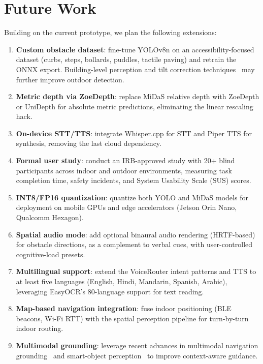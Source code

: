\section{Future Work}
\label{sec:future}

Building on the current prototype, we plan the following extensions:

\begin{enumerate}
    \item \textbf{Custom obstacle dataset}: fine-tune YOLOv8n on an accessibility-focused dataset (curbs, steps, bollards, puddles, tactile paving) and retrain the ONNX export. Building-level perception and tilt correction techniques~\cite{tilt_correction_building_detection2023} may further improve outdoor detection.
    \item \textbf{Metric depth via ZoeDepth}: replace MiDaS relative depth with ZoeDepth or UniDepth for absolute metric predictions, eliminating the linear rescaling hack.
    \item \textbf{On-device STT/TTS}: integrate Whisper.cpp for STT and Piper TTS for synthesis, removing the last cloud dependency.
    \item \textbf{Formal user study}: conduct an IRB-approved study with 20+ blind participants across indoor and outdoor environments, measuring task completion time, safety incidents, and System Usability Scale (SUS) scores.
    \item \textbf{INT8/FP16 quantization}: quantize both YOLO and MiDaS models for deployment on mobile GPUs and edge accelerators (Jetson Orin Nano, Qualcomm Hexagon).
    \item \textbf{Spatial audio mode}: add optional binaural audio rendering (HRTF-based) for obstacle directions, as a complement to verbal cues, with user-controlled cognitive-load presets.
    \item \textbf{Multilingual support}: extend the VoiceRouter intent patterns and TTS to at least five languages (English, Hindi, Mandarin, Spanish, Arabic), leveraging EasyOCR's 80-language support for text reading.
    \item \textbf{Map-based navigation integration}: fuse indoor positioning (BLE beacons, Wi-Fi RTT) with the spatial perception pipeline for turn-by-turn indoor routing.
    \item \textbf{Multimodal grounding}: leverage recent advances in multimodal navigation grounding~\cite{naacl2025_multimodal} and smart-object perception~\cite{perception_assistance_smart_objects2020} to improve context-aware guidance.
\end{enumerate}

